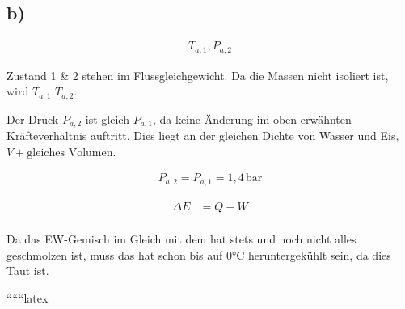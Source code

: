 

\subsection*{b)}

\begin{align*}
T_{a,1}, P_{a,2}
\end{align*}

Zustand 1 \& 2 stehen im Flussgleichgewicht. Da die Massen nicht isoliert ist, wird $T_{a,1}$  $T_{a,2}$.

Der Druck $P_{a,2}$ ist gleich $P_{a,1}$, da keine Änderung im oben erwähnten Kräfteverhältnis auftritt. Dies liegt an der gleichen Dichte von Wasser und Eis, $V + \text{gleiches Volumen}$.

\begin{align*}
P_{a,2} = P_{a,1} = 1,4 \, \text{bar}
\end{align*}

\begin{align*}
\Delta E &= Q - W \\
\end{align*}

Da das EW-Gemisch im Gleich mit dem hat stets und noch nicht alles geschmolzen ist, muss das hat schon bis auf 0°C heruntergekühlt sein, da dies Taut ist.

``````latex